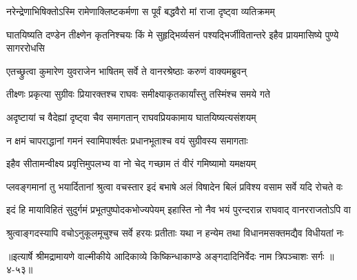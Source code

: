 \twolineshloka
{नरेन्द्रेणाभिषिक्तोऽस्मि रामेणाक्लिष्टकर्मणा}
{स पूर्वं बद्धवैरो मां राजा दृष्ट्वा व्यतिक्रमम्} %

\threelineshloka
{घातयिष्यति दण्डेन तीक्ष्णेन कृतनिश्चयः}
{किं मे सुहृद्भिर्व्यसनं पश्यद्भिर्जीवितान्तरे}
{इहैव प्रायमासिष्ये पुण्ये सागररोधसि} %

\twolineshloka
{एतच्छ्रुत्वा कुमारेण युवराजेन भाषितम्}
{सर्वे ते वानरश्रेष्ठाः करुणं वाक्यमब्रुवन्} %

\twolineshloka
{तीक्ष्णः प्रकृत्या सुग्रीवः प्रियारक्तश्च राघवः}
{समीक्ष्याकृतकार्यांस्तु तस्मिंश्च समये गते} %

\twolineshloka
{अदृष्टायां च वैदेह्यां दृष्ट्वा चैव समागतान्}
{राघवप्रियकामाय घातयिष्यत्यसंशयम्} %

\twolineshloka
{न क्षमं चापराद्धानां गमनं स्वामिपार्श्वतः}
{प्रधानभूताश्च वयं सुग्रीवस्य समागताः} %

\twolineshloka
{इहैव सीतामन्वीक्ष्य प्रवृत्तिमुपलभ्य वा}
{नो चेद् गच्छाम तं वीरं गमिष्यामो यमक्षयम्} %

\twolineshloka
{प्लवङ्गमानां तु भयार्दितानां श्रुत्वा वचस्तार इदं बभाषे}
{अलं विषादेन बिलं प्रविश्य वसाम सर्वे यदि रोचते वः} %

\twolineshloka
{इदं हि मायाविहितं सुदुर्गमं प्रभूतपुष्पोदकभोज्यपेयम्}
{इहास्ति नो नैव भयं पुरन्दरान्न राघवाद् वानरराजतोऽपि वा} %

\twolineshloka
{श्रुत्वाङ्गदस्यापि वचोऽनुकूलमूचुश्च सर्वे हरयः प्रतीताः}
{यथा न हन्येम तथा विधानमसक्तमद्यैव विधीयतां नः} %


॥इत्यार्षे श्रीमद्रामायणे वाल्मीकीये आदिकाव्ये किष्किन्धाकाण्डे अङ्गदादिनिर्वेदः नाम त्रिपञ्चाशः सर्गः ॥४-५३॥
